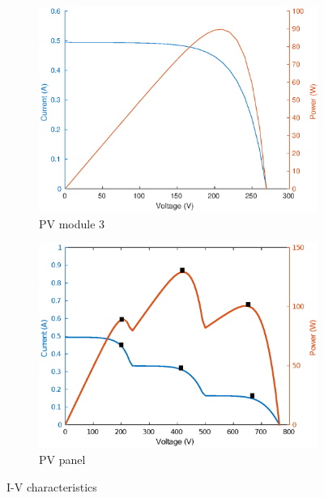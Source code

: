 \documentclass[conference]{IEEEtran}
\begin{document}
\begin{figure}
\begin{subfigure}[b]{0.3\linewidth}
        \includegraphics[width=\linewidth]{fig/Module_3.eps}
        \caption{PV module 3}
    \end{subfigure}
    \hfill
    \begin{subfigure}[b]{0.9\linewidth}
        \centering
        \vspace{3mm}
        \includegraphics[width=\linewidth]{fig/pv_panel_edit.eps}
        \caption{PV panel}
    \end{subfigure}
    \caption{I-V characteristics}
    \label{fig:IV}
\end{figure}
\end{document}

